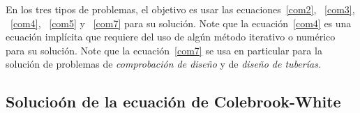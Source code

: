 \documentclass[10pt, oneside]{article}
\begin{document}
En los tres tipos de problemas, el objetivo es usar las ecuaciones~\ref{com2}, ~\ref{com3}, ~\ref{com4}, ~\ref{com5} y ~\ref{com7} para su soluci\'on. Note que la ecuaci\'on~\ref{com4} es una ecuaci\'on impl\'icita que requiere del uso de alg\'un m\'etodo iterativo o num\'erico para su soluci\'on. Note que la ecuaci\'on~\ref{com7} se usa en particular para la soluci\'on de problemas de \emph{comprobaci\'on de dise\~no} y de \emph{dise\~no de tuber\'ias}.


%
%
%
%
\subsection{Solucio\'on de la ecuaci\'on de Colebrook-White}
\end{document}
